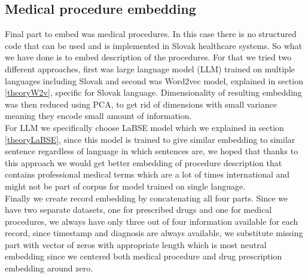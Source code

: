 \subsection{Medical procedure embedding}
\label{procedureEmb}

Final part to embed was medical procedures. In this case there is no structured code that can be used and is implemented in Slovak healthcare systems. So what we have done is to embed description of the procedures. For that we tried two different approaches, first was large language model (LLM) trained on multiple languages including Slovak and second was Word2vec model, explained in section \ref{theoryW2v}, specific for Slovak language. Dimensionality of resulting embedding was then reduced using PCA, to get rid of dimensions with small variance meaning they encode small amount of information. 
\\

For LLM we specifically choose LaBSE model which we explained in section \ref{theoryLaBSE}, since this model is trained to give similar embedding to similar sentence regardless of language in which sentences are, we hoped that thanks to this approach we would get better embedding of procedure description that contains professional medical terms which are a lot of times international and might not be part of corpus for model trained on single language.
\\


Finally we create record embedding by concatenating all four parts. Since we have two separate datasets, one for prescribed drugs and one for medical procedures, we always have only three out of four information available for each record, since timestamp and diagnosis are always available, we substitute missing part with vector of zeros with appropriate length which is most neutral embedding since we centered both medical procedure and drug prescription embedding around zero.

